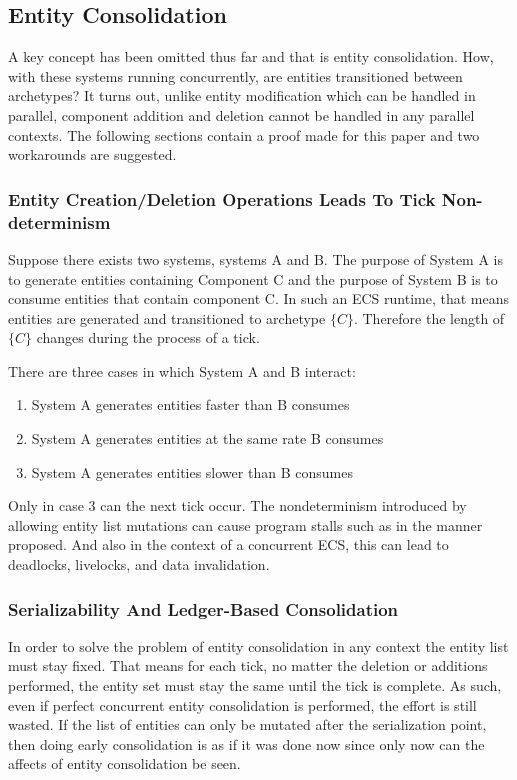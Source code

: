 \subsection{Entity Consolidation}
A key concept has been omitted thus far and that is entity consolidation. How, with these systems running concurrently, are entities transitioned between archetypes? It turns out, unlike entity modification which can be handled in parallel, component addition and deletion cannot be handled in any parallel contexts. The following sections contain a proof made for this paper and two workarounds are suggested.

\subsubsection{Entity Creation/Deletion Operations Leads To Tick Non-determinism}
\label{sec:proof1}
Suppose there exists two systems, systems A and B. The purpose of System A is to generate entities containing Component C and the purpose of System B is to consume entities that contain component C. In such an ECS runtime, that means entities are generated and transitioned to archetype $\{C\}$. Therefore the length of $\{C\}$ changes during the process of a tick. 

There are three cases in which System A and B interact:
\begin{enumerate}
    \item System A generates entities faster than B consumes
    \item System A generates entities at the same rate B consumes
    \item System A generates entities slower than B consumes
\end{enumerate}

Only in case 3 can the next tick occur. The nondeterminism introduced by allowing entity list mutations can cause program stalls such as in the manner proposed. And also in the context of a concurrent ECS, this can lead to deadlocks, livelocks, and data invalidation.

\subsubsection{Serializability And Ledger-Based Consolidation}
\label{sec:ledger}
In order to solve the problem of entity consolidation in any context the entity list must stay fixed. That means for each tick, no matter the deletion or additions performed, the entity set must stay the same until the tick is complete. As such, even if perfect concurrent entity consolidation is performed, the effort is still wasted. If the list of entities can only be mutated after the serialization point, then doing early consolidation is as if it was done now since only now can the affects of entity consolidation be seen. 

